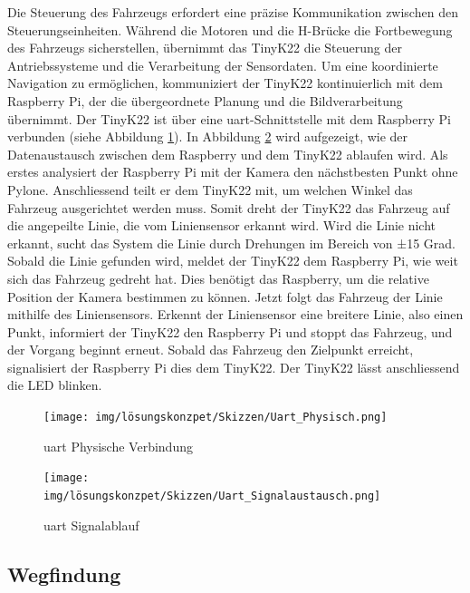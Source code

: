 \documentclass[../main.tex]{subfiles}
\begin{document}
Die Steuerung des Fahrzeugs erfordert eine präzise Kommunikation zwischen den Steuerungseinheiten. Während die Motoren und die H-Brücke die Fortbewegung des Fahrzeugs sicherstellen, übernimmt das TinyK22 die Steuerung der Antriebssysteme und die Verarbeitung der Sensordaten. Um eine koordinierte Navigation zu ermöglichen, kommuniziert der TinyK22 kontinuierlich mit dem Raspberry Pi, der die übergeordnete Planung und die Bildverarbeitung übernimmt.
\newpage
Der TinyK22 ist über eine \Gls{uart}-Schnittstelle mit dem Raspberry Pi verbunden (siehe Abbildung \ref{img:UART_Physisch}). In Abbildung \ref{img:UART_Signalablauf} wird aufgezeigt, wie der Datenaustausch zwischen dem Raspberry und dem TinyK22 ablaufen wird. Als erstes  analysiert der Raspberry Pi mit der Kamera den nächstbesten Punkt ohne Pylone. Anschliessend teilt er dem TinyK22 mit, um welchen Winkel das Fahrzeug ausgerichtet werden muss. Somit dreht der TinyK22 das Fahrzeug auf die angepeilte Linie, die vom Liniensensor erkannt wird. Wird die Linie nicht erkannt, sucht das System die Linie durch Drehungen im Bereich von ±15 Grad. Sobald die Linie gefunden wird, meldet der TinyK22 dem Raspberry Pi, wie weit sich das Fahrzeug gedreht hat. Dies benötigt das Raspberry, um die relative Position der Kamera bestimmen zu können. Jetzt folgt das Fahrzeug der Linie mithilfe des Liniensensors. Erkennt der Liniensensor eine breitere Linie, also einen Punkt, informiert der TinyK22 den Raspberry Pi und stoppt das Fahrzeug, und der Vorgang beginnt erneut. Sobald das Fahrzeug den Zielpunkt erreicht, signalisiert der Raspberry Pi dies dem TinyK22. Der TinyK22 lässt anschliessend die LED blinken.

\begin{figure}[H]
\centering
\texttt{[image: img/lösungskonzpet/Skizzen/Uart\_Physisch.png]}
\caption{\Gls{uart} Physische Verbindung}
\label{img:UART_Physisch}
\end{figure}

\begin{figure}[H]
\centering
\texttt{[image: img/lösungskonzpet/Skizzen/Uart\_Signalaustausch.png]}
\caption{\Gls{uart} Signalablauf}
\label{img:UART_Signalablauf}
\end{figure}




\newpage

\subsection{Wegfindung}
\end{document}
